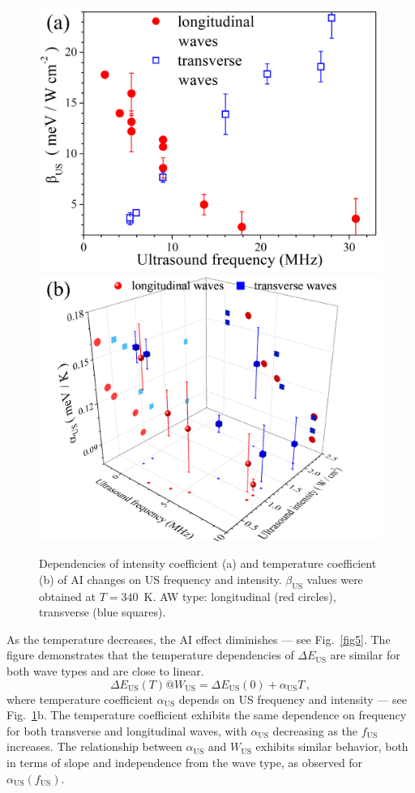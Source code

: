 \documentclass{ttp}
\begin{document}
\begin{figure}
	\centering
     \includegraphics[width=0.4\linewidth]{Fig4a.png}
     \includegraphics[width=0.4\linewidth]{Fig4b.png}
	  \caption{Dependencies of intensity coefficient (a)
       and temperature coefficient (b) of AI changes on US frequency and intensity.
       $\beta_\mathrm{US}$ values were obtained at $T=340$~K.
       AW type: longitudinal (red circles), transverse (blue squares).
}\label{fig4}
\end{figure}

As the temperature decreases, the AI effect diminishes --- see Fig.~\ref{fig5}.
The figure demonstrates that the temperature dependencies of $\Delta E_\mathrm{US}$ are similar for both wave types and are close to linear.
\begin{equation}
\label{eqEmT}
\Delta E_\mathrm{US}(T)@ W_\mathrm{US}=\Delta E_\mathrm{US}(0)+\alpha_\mathrm{US}T\,,
\end{equation}
where temperature coefficient $\alpha_\mathrm{US}$ depends on US frequency and intensity --- see Fig.~\ref{fig4}b.
The temperature coefficient exhibits the same dependence on frequency
for both transverse and longitudinal waves, with $\alpha_\mathrm{US}$ decreasing as the $f_\mathrm{US}$ increases.
The relationship between $\alpha_\mathrm{US}$ and $W_\mathrm{US}$ exhibits
similar behavior, both in terms of slope and independence from the wave type, as observed for $\alpha_\mathrm{US}(f_\mathrm{US})$.
\end{document}
